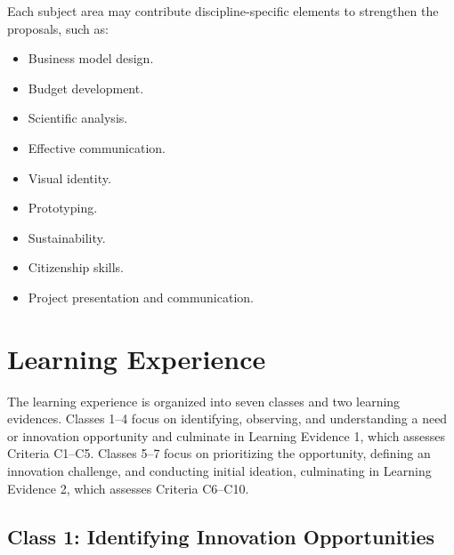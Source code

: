 \documentclass[12pt,a4paper]{article}
\begin{document}
	Each subject area may contribute discipline-specific elements to
	strengthen the proposals, such as:
	
	\begin{itemize}
		
		\item Business model design.
		
		\item Budget development.
		
		\item Scientific analysis.
		
		\item Effective communication.
		
		\item Visual identity.
		
		\item Prototyping.
		
		\item Sustainability.
		
		\item Citizenship skills.
		
		\item Project presentation and communication.
		
	\end{itemize}
	
	
	\section{Learning Experience}
	
	The learning experience is organized into seven classes and two learning evidences. Classes 1--4 focus on identifying, observing, and understanding a need or innovation opportunity and culminate in Learning Evidence 1, which assesses Criteria C1--C5. Classes 5--7 focus on prioritizing the opportunity, defining an innovation challenge, and conducting initial ideation, culminating in Learning Evidence 2, which assesses Criteria C6--C10.
	
	
	\subsection{Class 1: Identifying Innovation Opportunities}
	
\end{document}
